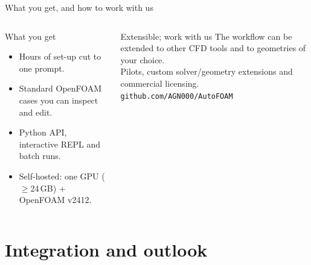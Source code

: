 \documentclass[aspectratio=169,10pt]{beamer}
\begin{document}
\begin{frame}{What you get, and how to work with us}
\begin{columns}[T,onlytextwidth]
\begin{block}{What you get}
\small
\begin{itemize}
  \item Hours of set-up cut to one prompt.
  \item Standard OpenFOAM cases you can inspect and edit.
  \item Python API, interactive REPL and batch runs.
  \item Self-hosted: one GPU ($\ge$24\,GB) + OpenFOAM v2412.
\end{itemize}
\end{block}
\begin{block}{Extensible; work with us}
\small
The workflow can be extended to other CFD tools and to geometries of your choice.\\[3pt]
Pilots, custom solver/geometry extensions and commercial licensing.\\[3pt]
\scriptsize\texttt{github.com/AGN000/AutoFOAM}
\end{block}
\end{columns}
\end{frame}

\section{Integration and outlook}
\end{document}
